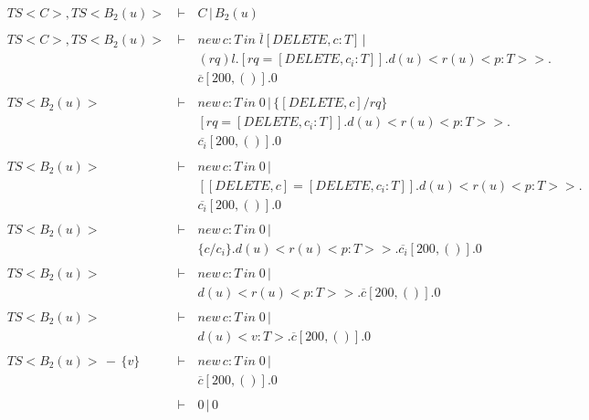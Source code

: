 \setcounter{equation}{0}
\begin{eqnarray*}
 \ TS<C>,TS<B_2(u)>\, &\vdash\,&  C\,|\,B_2(u) \\
 \               &        &          \\
 \ TS<C>,TS<B_2(u)>\, &\vdash\,& new\,c:T\,in\;\overline{l}[DELETE,c:T]\,|\\
 \               &\,      & (rq)l.[rq = [DELETE,c_i:T]].d(u)<r(u)<p:T>>.\\
 \               &\,      & \overline{c}[200,()].0\\
 \               &        &          \\
 \ TS<B_2(u)>\, &\vdash\,& new\,c:T\,in\;0\,|\,\{[DELETE,c]/rq\}\\
 \               &\,      & [rq = [DELETE,c_i:T]].d(u)<r(u)<p:T>>.\\
 \               &\,      & \overline{c_i}[200,()].0\\
 \               &        &          \\
 \ TS<B_2(u)>\, &\vdash\,& new\,c:T\,in\;0\,|\,\\
 \               &\,      & [[DELETE,c] = [DELETE,c_i:T]].d(u)<r(u)<p:T>>.\\
 \               &\,      & \overline{c_i}[200,()].0\\
 \               &        &          \\
 \ TS<B_2(u)>\, &\vdash\,& new\,c:T\,in\;0\,|\,\\
 \               &\,      & \{c/c_i\}.d(u)<r(u)<p:T>>.\overline{c_i}[200,()].0\\
 \               &        &          \\
 \ TS<B_2(u)>\, &\vdash\,& new\,c:T\,in\;0\,|\,\\
 \               &\,      & d(u)<r(u)<p:T>>.\overline{c}[200,()].0\\
 \               &        &          \\
 \ TS<B_2(u)>\, &\vdash\,& new\,c:T\,in\;0\,|\,\\
 \               &\,      & d(u)<v:T>.\overline{c}[200,()].0\\
 \               &        &          \\
 \ TS<B_2(u)>\,-\,\{v\}\, &\vdash\,& new\,c:T\,in\;0\,|\,\\
 \               &\,      & \overline{c}[200,()].0\\
 \               &        &          \\
 \ &\vdash\,& 0\,|\,0\\
\end{eqnarray*}

